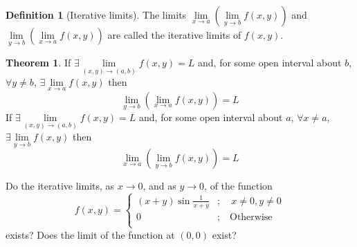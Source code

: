 \documentclass[fleqn, a4paper, 12pt, twoside]{article}
\theoremstyle{definition}
\newtheorem{definition}{Definition}
\theoremstyle{theorem}
\newtheorem{theorem}{Theorem}
\begin{document}
{\begin{definition}[Iterative limits]
	The limits $\lim\limits_{x \to a} \left( \lim\limits_{y \to b} f(x,y) \right)$ and $\lim\limits_{y \to b} \left( \lim\limits_{x \to a} f(x,y) \right)$ are called the iterative limits of $f(x,y)$.
\end{definition}

\begin{theorem}
	If $\exists \lim\limits_{(x,y) \to (a,b)} f(x,y) = L$ and, for some open interval about $b$, $\forall y \neq b$, $\exists \lim\limits_{x \to a} f(x,y)$ then 
	\begin{equation*}
		\lim\limits_{y \to b} \left( \lim\limits_{x \to a} f(x,y) \right) = L
	\end{equation*}
	If $\exists \lim\limits_{(x,y) \to (a,b)} f(x,y) = L$ and, for some open interval about $a$, $\forall x \neq a$, $\exists \lim\limits_{y \to b} f(x,y)$ then 
	\begin{equation*}
		\lim\limits_{x \to a} \left( \lim\limits_{y \to b} f(x,y) \right) = L
	\end{equation*}
\end{theorem}

\begin{question}
	Do the iterative limits, as $x \to 0$, and as $y \to 0$, of the function
	\begin{equation*}
		f(x,y) = 
			\begin{cases}
				(x + y) \sin \frac{1}{x + y} & ;\quad x \neq 0, y \neq 0 \\
				0                            & ;\quad \text{Otherwise}   \\
			\end{cases}
	\end{equation*}
	exists?
	Does the limit of the function at $(0,0)$ exist?
\end{question}

}
\end{document}
